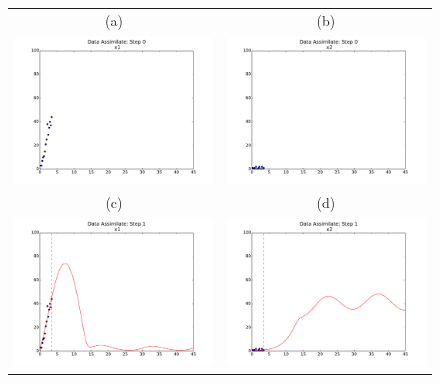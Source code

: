 \documentclass[11pt,twoside]{article}
\numberwithin{equation}{section}
\begin{document}
\begin{figure}[ht!]
  \begin{center}
   \begin{tabular}{c c}
    (a) & (b) \\
    \includegraphics[width=3in]{DSStep0x1.pdf} &
    \includegraphics[width=3in]{DSStep0x2.pdf} \\
    (c) & (d) \\
    \includegraphics[width=3in]{DSStep1x1.pdf} &
    \includegraphics[width=3in]{DSStep1x2.pdf} \\

\end{tabular}
\end{center}
\end{figure}
\end{document}
